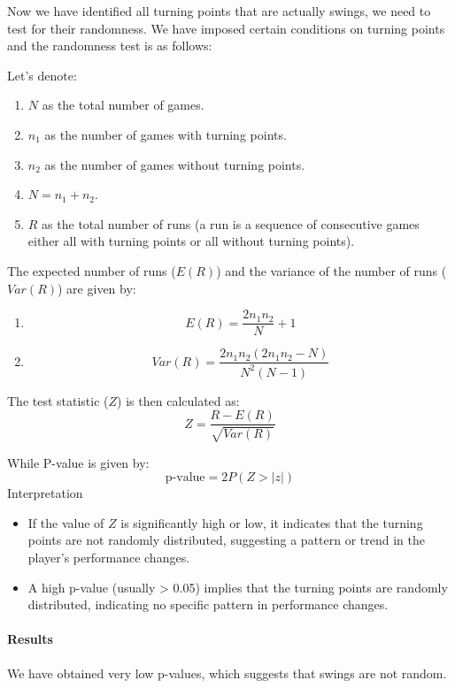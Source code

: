 \documentclass[11pt,a4paper]{article}
\begin{document}
	Now we have identified all turning points that are actually swings, we need to test for their randomness. We have imposed certain conditions on turning points and the randomness test is as follows:
		
	Let's denote:
	\begin{enumerate}
		\item \( N \) as the total number of games.
		\item \( n_1 \) as the number of games with turning points.
		\item \( n_2 \) as the number of games without turning points.
		\item \( N = n_1 + n_2 \).
		\item \( R \) as the total number of runs (a run is a sequence of consecutive games either all with turning points or all without turning points).
	\end{enumerate}
		
	The expected number of runs (\( E(R) \)) and the variance of the number of runs (\( Var(R) \)) are given by:
	\begin{enumerate}
		\item \[ E(R) = \frac{2n_1n_2}{N} + 1 \]
		\item \[ Var(R) = \frac{2n_1n_2(2n_1n_2 - N)}{N^2(N - 1)} \]
	\end{enumerate}
	
	The test statistic (\( Z \)) is then calculated as:
	\[ Z = \frac{R - E(R)}{\sqrt{Var(R)}} \]
	
	While P-value is given by:
	\[ \text{p-value} = 2P(Z > |z|) \]
	Interpretation	
	\begin{itemize}
		\item If the value of \( Z \) is significantly high or low, it indicates that the turning points are not randomly distributed, suggesting a pattern or trend in the player's performance changes.
		\item A high p-value (usually > 0.05) implies that the turning points are randomly distributed, indicating no specific pattern in performance changes.	
	\end{itemize}
	\paragraph{Results}
	We have obtained very low p-values, which suggests that swings are not random.
	
	
	
\end{document}
